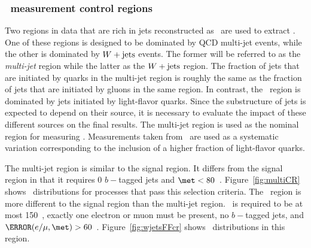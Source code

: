 \subsubsection{\FF\ measurement control regions}
\par Two regions in data that are rich in jets reconstructed as \tauvis\ are 
used to extract \FF. One of these regions is designed to be dominated by QCD multi-jet events,
 while the other is dominated by $W+\text{jets}$ events. The former will be referred to as the {\it multi-jet} 
region while the latter as the $W+\text{jets}$ region. The fraction of jets that are initiated by quarks 
in the multi-jet region is roughly the same as the fraction of jets that are initiated by gluons 
in the same region. In contrast, the \Wjets\ region is dominated by jets initiated by light-flavor quarks.
Since the substructure of jets is expected to depend on their source, it is necessary to evaluate the impact 
of these different sources on the final results. The multi-jet region is used as the nominal region for measuring 
\FF. Measurements taken from \Wjets\ are used as a systematic variation corresponding to the inclusion of a higher 
fraction of light-flavor quarks.  

\par The multi-jet region is similar to the signal region. It differs from the signal region 
in that it requires 0 $b-$tagged jets and $\met<80$~\GeV. Figure~\ref{fig:multiCR} shows 
\mT\ distributions for processes that pass this selection criteria. The \Wjets\ region is more different to the signal region than 
the multi-jet region. \met\ is required to be at most 150~\GeV, exactly one electron or muon must 
be present, no $b-$tagged jets, and $\mT(e/\mu,\met)>60$~\GeV. Figure~\ref{fig:wjetsFFcr} shows 
\mT\ distributions in this region.  

